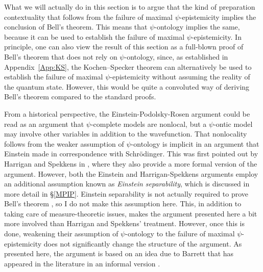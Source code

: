 \documentclass[DIV=calc,paper=a4,fontsize=11pt,twocolumn]{scrartcl} %
\theoremstyle{definition}
\theoremstyle{plain}
\begin{document}
What we will actually do in this section is to argue that the kind of
preparation contextuality that follows from the failure of maximal
$\psi$-epistemicity implies the conclusion of Bell's theorem.  This
means that $\psi$-ontology implies the same, because it can be used to
establish the failure of maximal $\psi$-epistemicity.  In principle,
one can also view the result of this section as a full-blown proof of
Bell's theorem that does not rely on $\psi$-ontology, since, as
established in Appendix~\ref{App:KS}, the Kochen--Specker theorem can
alternatively be used to establish the failure of maximal
$\psi$-epistemicity without assuming the reality of the quantum state.
However, this would be quite a convoluted way of deriving Bell's
theorem compared to the standard proofs.

From a historical perspective, the Einstein-Podolsky-Rosen argument
\cite{Einstein1935} could be read as an argument that $\psi$-complete
models are nonlocal, but a $\psi$-ontic model may involve other
variables in addition to the wavefunction.  That nonlocality follows
from the weaker assumption of $\psi$-ontology is implicit in an
argument that Einstein made in correspondence with Schr{\"o}dinger.
This was first pointed out by Harrigan and Spekkens in
\cite{Harrigan2010}, where they also provide a more formal version of
the argument.  However, both the Einstein and Harrigan-Spekkens
arguments employ an additional assumption known as \emph{Einstein
separability}, which is discussed in more detail in \S\ref{MPIP}.
Einstein separability is not actually required to prove Bell's theorem
\cite{Henson2013}, so I do not make this assumption here.  This, in
addition to taking care of measure-theoretic issues, makes the
argument presented here a bit more involved than Harrigan and
Spekkens' treatment.  However, once this is done, weakening their
assumption of $\psi$-ontology to the failure of maximal
$\psi$-epistemicity does not significantly change the structure of the
argument.  As presented here, the argument is based on an idea due to
Barrett \cite{Barrett2004} that has appeared in the literature in an
informal version \cite{Leifer2013c}.
\end{document}
